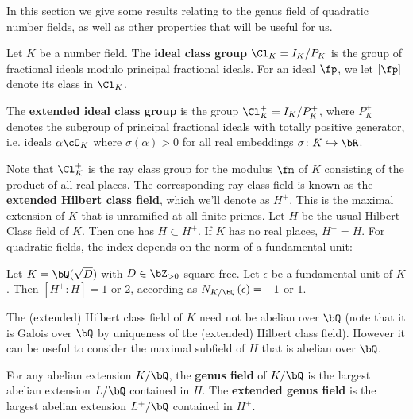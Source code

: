 In this section we give some results relating to the genus field of quadratic number fields, as well as other properties that will be useful for us.

Let $K$ be a number field. The \textbf{ideal class group} $\Cl_K = I_K / P_K$ is the group of fractional ideals modulo principal fractional ideals.
For an ideal $\fp$, we let $[\fp]$ denote its class in $\Cl_K$.

The \textbf{extended ideal class group} is the group $\Cl_K^{+} = I_K / P_K^{+}$, where
$P_K^{+}$ denotes the subgroup of principal fractional ideals with totally positive generator, i.e. ideals $\alpha \cO_K$ where $\sigma(\alpha) > 0$ for all real embeddings $\sigma \colon K \emb \bR$.

Note that $\Cl_K^{+}$ is the ray class group for the modulus $\fm$ of $K$ consisting of the product of all real places. The corresponding ray class field is known as the \textbf{extended Hilbert class field}, which we'll denote as $H^{+}$. This is the maximal extension of $K$ that is unramified at all finite primes. Let $H$ be the usual Hilbert Class field of $K$. Then one has $H \subset H^{+}$. %
%
If $K$ has no real places, $H^{+} = H$. For quadratic fields, the index depends on the norm of a fundamental unit:

\begin{thm}\cite[Chapter VI, Theorem 3.2]{Janusz}
    Let $K = \bQ(\sqrt{D})$ with $D \in \bZ_{> 0}$ square-free. Let $\epsilon$ be a fundamental unit of $K$. Then $[H^{+} \colon H] = 1$ or $2$, according as $N_{K / \bQ}\left(\epsilon\right) = -1$ or $1$. 
\end{thm}

The (extended) Hilbert class field of $K$ need not be abelian over $\bQ$ (note that it is Galois over $\bQ$ by uniqueness of the (extended) Hilbert class field). However it can be useful to consider the maximal subfield of $H$ that is abelian over $\bQ$. 

\begin{defn}
    For any abelian extension $K / \bQ$, the \textbf{genus field} of $K / \bQ$ is the largest abelian extension $L / \bQ$ contained in $H$. The \textbf{extended genus field } is the largest abelian extension $L^{+} / \bQ $ contained in $H^{+}$.
\end{defn}



